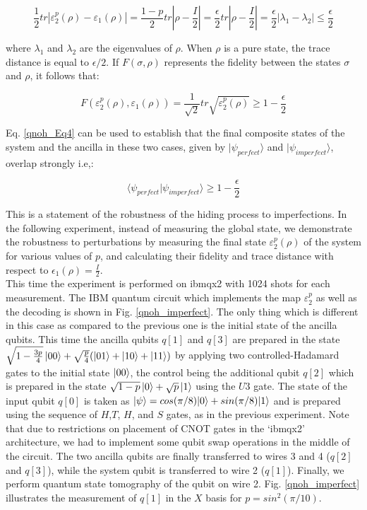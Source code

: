 \begin{equation}\label{qnoh_Eq3}
    \frac{1}{2}tr|\varepsilon^p_2(\rho)-\varepsilon_1(\rho)|=\frac{1-p}{2}tr|\rho-\frac{I}{2}|=\frac{\epsilon}{2}tr|\rho-\frac{I}{2}|=\frac{\epsilon}{2}|\lambda_1-\lambda_2|\leq \frac{\epsilon}{2}
\end{equation}

where $\lambda_1$ and $\lambda_2$ are the eigenvalues of $\rho$. When $\rho$ is a pure state, the trace distance is equal to $\epsilon/2$. If $F(\sigma,\rho)$ represents the fidelity between the states $\sigma$ and $\rho$, it follows that:

\begin{equation}\label{qnoh_Eq4}
    F(\varepsilon_2^p(\rho),\varepsilon_1(\rho))=\frac{1}{\sqrt{2}}tr \sqrt{\varepsilon_2^p(\rho)} \geq  1 - \frac{\epsilon}{2}
\end{equation}

Eq. \eqref{qnoh_Eq4} can be used to establish that the final composite states of the system and the ancilla in these two cases, given by $|\psi_{perfect}\rangle$ and $|\psi_{imperfect}\rangle$, overlap strongly i.e,:

\begin{equation}\label{qnoh_Eq5}
    \langle \psi_{perfect} | \psi_{imperfect} \rangle \geq 1 - \frac{\epsilon}{2}
\end{equation}

This is a statement of the robustness of the hiding process to imperfections. In the following experiment, instead of measuring the global state, we demonstrate the robustness to perturbations by measuring the final state $\varepsilon_2^p(\rho)$ of the system for various values of $p$, and calculating their fidelity and trace distance with respect to $\epsilon_1(\rho)=\frac{I}{2}$.\\

This time the experiment is performed on ibmqx2 with 1024 shots for each measurement. The IBM quantum circuit which implements the map $\varepsilon_2^p$ as well as the decoding is shown in Fig. \ref{qnoh_imperfect}. The only thing which is different in this case as compared to the previous one is the initial state of the ancilla qubits. This time the ancilla qubits $q[1]$ and $q[3]$ are prepared in the state $\sqrt{1-\frac{3p}{4}}\ket{00}+\sqrt{\frac{p}{4}}(\ket{01}+\ket{10}+\ket{11})$
by applying two controlled-Hadamard gates to the initial state $\ket{00}$, the control being the additional qubit $q[2]$ which is prepared in the state $\sqrt{1-p}\ket{0}+\sqrt{p}\ket{1}$ using the $U3$ gate. The state of the input qubit $q[0]$ is taken as $\ket{\psi}=cos(\pi/8)|0\rangle+sin(\pi/8)|1\rangle$  and is prepared using the sequence of $H$,$T$, $H$, and $S$ gates, as in the previous experiment. Note that due to restrictions on placement of CNOT gates in the `ibmqx2' architecture, we had to implement some qubit swap operations in the middle of the circuit. The two ancilla qubits are finally transferred to wires 3 and 4 ($q[2]$ and $q[3]$), while the system qubit is transferred to wire 2 ($q[1]$). Finally, we perform quantum state tomography of the qubit on wire 2. Fig. \ref{qnoh_imperfect} illustrates the measurement of $q[1]$ in the $X$ basis for $p=sin^2(\pi/10)$.

